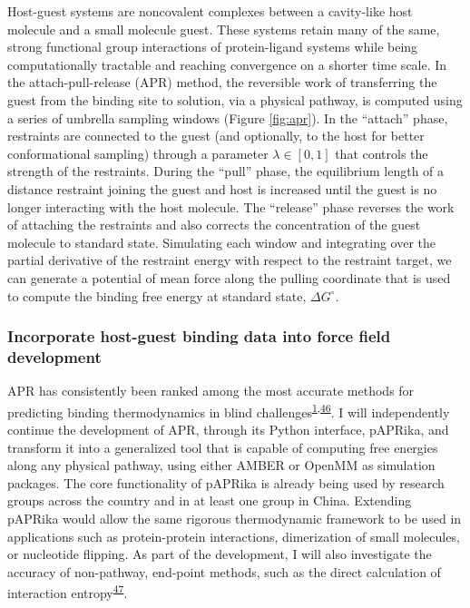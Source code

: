 \documentclass[11pt,notitlepage]{article}
\begin{document}
Host-guest systems are noncovalent complexes between a cavity-like host
molecule and a small molecule guest. These systems retain many of the
same, strong functional group interactions of protein-ligand systems
while being computationally tractable and reaching convergence on a
shorter time scale. In the attach-pull-release (APR) method, the
reversible work of transferring the guest from the binding site to
solution, via a physical pathway, is computed using a series of umbrella
sampling windows (Figure \ref{fig:apr}). In the ``attach'' phase,
restraints are connected to the guest (and optionally, to the host for
better conformational sampling) through a parameter
\(\lambda \in [0, 1]\) that controls the strength of the restraints.
During the ``pull'' phase, the equilibrium length of a distance
restraint joining the guest and host is increased until the guest is no
longer interacting with the host molecule. The ``release'' phase
reverses the work of attaching the restraints and also corrects the
concentration of the guest molecule to standard state. Simulating each
window and integrating over the partial derivative of the restraint
energy with respect to the restraint target, we can generate a potential
of mean force along the pulling coordinate that is used to compute the
binding free energy at standard state, \(\Delta G^\circ\).

\hypertarget{incorporate-host-guest-binding-data-into-force-field-development}{%
\subsubsection{Incorporate host-guest binding data into force field
development}\label{incorporate-host-guest-binding-data-into-force-field-development}}

APR has consistently been ranked among the most accurate methods for
predicting binding thermodynamics in blind
challenges\textsuperscript{\protect\hyperlink{ref-BGsUYQln}{1},\protect\hyperlink{ref-GA1AFcUw}{46}}.
I will independently continue the development of APR, through its Python
interface, pAPRika, and transform it into a generalized tool that is
capable of computing free energies along any physical pathway, using
either AMBER or OpenMM as simulation packages. The core functionality of
pAPRika is already being used by research groups across the country and
in at least one group in China. Extending pAPRika would allow the same
rigorous thermodynamic framework to be used in applications such as
protein-protein interactions, dimerization of small molecules, or
nucleotide flipping. As part of the development, I will also investigate
the accuracy of non-pathway, end-point methods, such as the direct
calculation of interaction
entropy\textsuperscript{\protect\hyperlink{ref-gRfhPG7N}{47}}.
\end{document}
